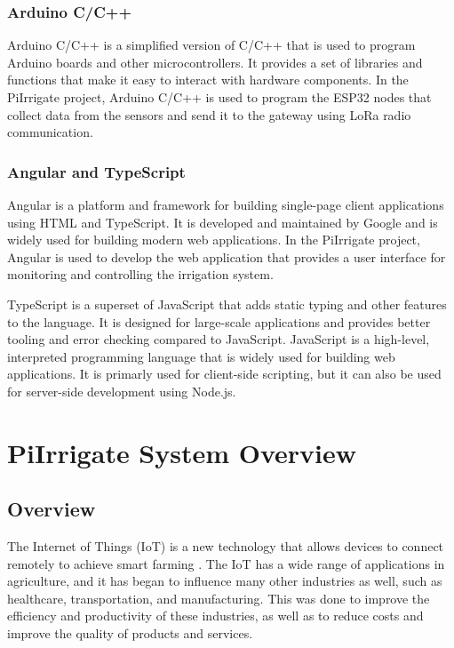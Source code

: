\subsection{Arduino C/C++}
Arduino C/C++ is a simplified version of C/C++ that is used to program Arduino 
boards and other microcontrollers\cite{arduino}.
It provides a set of libraries and functions that make it easy to interact with hardware components.
In the PiIrrigate project, Arduino C/C++ is used to program the ESP32 nodes that collect data from the sensors
and send it to the gateway using LoRa radio communication.

\subsection{Angular and TypeScript}
Angular is a platform and framework for building single-page client applications using HTML and TypeScript.
It is developed and maintained by Google and is widely used for building modern web applications\cite{angular}.
In the PiIrrigate project, Angular is used to develop the web application that provides a user interface for
monitoring and controlling the irrigation system.

TypeScript is a superset of JavaScript that adds static typing and other features to the language.
It is designed for large-scale applications and provides better tooling and error checking compared to JavaScript.
JavaScript is a high-level, interpreted programming language that is widely used for building web applications.
It is primarly used for client-side scripting, but it can also be used for
 server-side development using Node.js\cite{typescript}.

\chapter{PiIrrigate System Overview}\label{section:overview}

\section{Overview}
The Internet of Things (IoT) is a new technology that allows devices to connect remotely to achieve smart
farming \cite{agriculture12101745}. The IoT has a wide range of applications in agriculture, and it has 
began to influence many other industries as well, such as healthcare, transportation, and manufacturing. 
This was done to improve the efficiency and productivity of these industries, 
as well as to reduce costs and improve the quality of products and services\cite{s19081833}.

